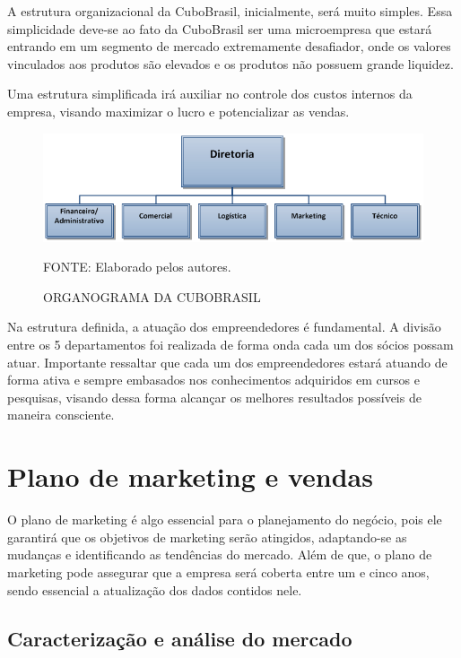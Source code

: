 \documentclass[
	12pt,				%
	openright,			%
	oneside,			%
	a4paper,			%
	english,			%
	french,				%
	spanish,			%
	brazil				%
	]{abntex2}
\begin{document}
	A estrutura organizacional da CuboBrasil, inicialmente, será muito simples. Essa simplicidade deve-se ao fato da CuboBrasil ser uma microempresa que estará entrando em um segmento de mercado extremamente desafiador, onde os valores vinculados aos produtos são elevados e os produtos não possuem grande liquidez.
	
	Uma estrutura simplificada irá auxiliar no controle dos custos internos da empresa, visando maximizar o lucro e potencializar as vendas.
	
	\begin{figure}[th]
		\caption{ORGANOGRAMA DA CUBOBRASIL}
		\centering
		\includegraphics[width=1.0\linewidth]{./figs/Figura_10}
		
		\begin{small}
			FONTE: Elaborado pelos autores.
		\end{small}
	\end{figure}
	\pagebreak
	Na estrutura definida, a atuação dos empreendedores é fundamental. A divisão entre os 5 departamentos foi realizada de forma onda cada um dos sócios possam atuar. Importante ressaltar que cada um dos empreendedores estará atuando de forma ativa e sempre embasados nos conhecimentos adquiridos em cursos e pesquisas, visando dessa forma alcançar os melhores resultados possíveis de maneira consciente.
	
\chapter[Plano de marketing e vendas]{Plano de marketing e vendas}

	O plano de marketing é algo essencial para o planejamento do negócio, pois ele garantirá que os objetivos de marketing serão atingidos, adaptando-se as mudanças e identificando as tendências do mercado. Além de que, o plano de marketing pode assegurar que a empresa será coberta entre um e cinco anos, sendo essencial a atualização dos dados contidos nele. 

\section[Caracterização e análise do mercado]{Caracterização e análise do mercado}
\end{document}
